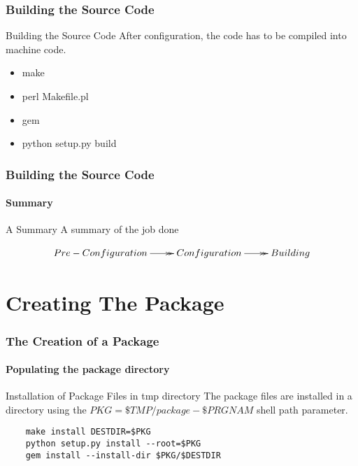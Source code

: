 \documentclass[12pt,hyperref={pdfpagelabels=true}]{beamer}
\begin{document}
\begin{frame}
  \frametitle{Building the Source Code}
  \begin{block}{Building the Source Code}
    After configuration, the code has to be compiled into machine code.
  \end{block}
  
  \pause
  
  \begin{example}
    \begin{itemize}[<+-| alert@+>]
    \item make
    \item perl Makefile.pl
    \item gem
    \item python setup.py build
    \end{itemize}
  \end{example}
\end{frame}

\begin{frame}
  \frametitle{Building the Source Code}
  \framesubtitle{Summary}
  \begin{block}{A Summary}
    A summary of the job done
  \end{block}
  \begin{equation*}
    \xymatrix@C=2pc@R=2pc{
      Pre-Configuration\ar@{->>}[r] & Configuration\ar@{->>}[r] & Building}
  \end{equation*}
\end{frame}

\section{Creating The Package}

\begin{frame}[fragile]
  \frametitle{The Creation of a Package}
  \framesubtitle{Populating the package directory}
  \begin{block}{Installation of Package Files in tmp directory}
    The package files are installed in a directory using the
    $PKG=\$TMP/package-\$PRGNAM$ shell path parameter.
  \end{block}
  
  \pause
  
  \begin{lstlisting}
    make install DESTDIR=$PKG
    python setup.py install --root=$PKG
    gem install --install-dir $PKG/$DESTDIR
  \end{lstlisting}
  
  
\end{frame}
\end{document}
